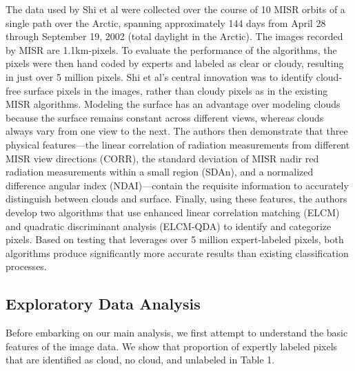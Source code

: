 \documentclass[12pt]{article}
\begin{document}
\newline
\newline 
The data used by Shi et al were collected over the course of 10 MISR orbits of a single path over the Arctic, spanning approximately 144 days from April 28 through September 19, 2002 (total daylight in the Arctic). The images recorded by MISR are 1.1km-pixels. To evaluate the performance of the algorithms, the pixels were then hand coded by experts and labeled as clear or cloudy, resulting in just over 5 million pixels. Shi et al's central innovation was to identify cloud-free surface pixels in the images, rather than cloudy pixels as in the existing MISR algorithms. Modeling the surface has an advantage over modeling clouds because the surface remains constant across different views, whereas clouds always vary from one view to the next. The authors then demonstrate that three physical features---the linear correlation of radiation measurements from different MISR view directions (CORR), the standard deviation of MISR nadir red radiation measurements within a small region (SDAn), and a normalized difference angular index (NDAI)---contain the requisite information to accurately distinguish between clouds and surface. Finally, using these features, the authors develop two algorithms that use enhanced linear correlation matching (ELCM) and quadratic discriminant analysis (ELCM-QDA) to identify and categorize pixels. Based on testing that leverages over 5 million expert-labeled pixels, both algorithms produce significantly more accurate results than existing classification processes.

\subsection{Exploratory Data Analysis}
Before embarking on our main analysis, we first attempt to understand the basic features of the image data. We show that proportion of expertly labeled pixels that are identified as cloud, no cloud, and unlabeled in Table 1.  
\end{document}
